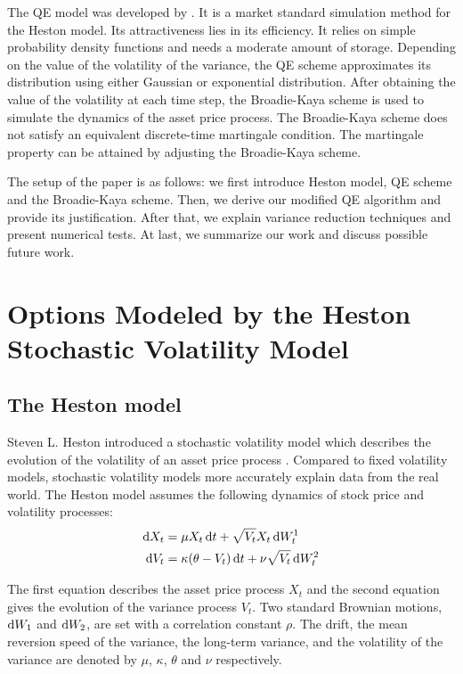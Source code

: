 \documentclass{ws-ijfe}
\begin{document}
The QE model was developed by \cite{Andersen2006}. It is a market standard simulation method for the Heston model. Its attractiveness lies in its efficiency. It relies on simple probability density functions and needs a moderate amount of storage. Depending on the value of the volatility of the variance, the QE scheme approximates its distribution using either Gaussian or exponential distribution. After obtaining the value of the volatility at each time step, the Broadie-Kaya scheme is used to simulate the dynamics of the asset price process. The Broadie-Kaya scheme does not satisfy an equivalent discrete-time martingale condition. The martingale property can be attained by adjusting the Broadie-Kaya scheme.

The setup of the paper is as follows: we first introduce Heston model, QE scheme and the Broadie-Kaya scheme. Then, we derive our modified QE algorithm and provide its justification. After that, we explain variance reduction techniques and present numerical tests. At last, we summarize our work and discuss possible future work.

\section{Options Modeled by the Heston Stochastic Volatility Model}
\subsection{The Heston model}
Steven L. Heston introduced a stochastic volatility model which describes the evolution of the volatility of an asset price process \cite{Heston1993}. Compared to fixed volatility models, stochastic volatility models more accurately explain data from the real world.
The Heston model assumes the following dynamics of stock price and volatility processes:
 \begin{align}
    \d X_t & =\mu X_t\,\d t+\sqrt{V_t}X_t\,\d W_t^1\label{eq1}\\
    \d V_t &= \kappa (\theta-V_t)\,\d t +\nu\sqrt{V_t}\,\d W_t^2\label{eq2}
  \end{align}

The first equation describes the asset price process $X_t$ and the second equation gives the evolution of the variance process $V_t$. Two standard Brownian motions, $\mathrm{d} W_1$ and $\mathrm{d} W_2$, are set with a correlation constant $\rho$. The drift, the mean reversion speed of the variance, the long-term variance, and the volatility of the variance are denoted by $\mu$, $\kappa$, $\theta$ and $\nu$ respectively.
\end{document}
